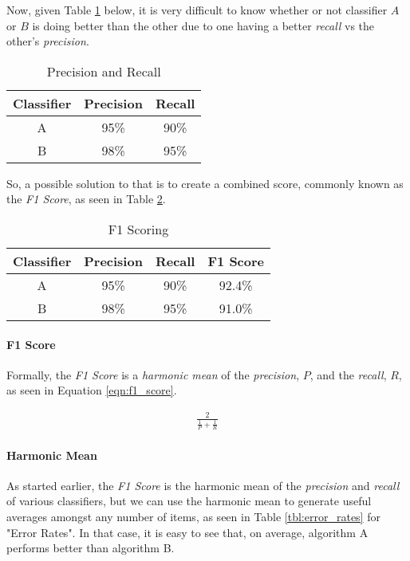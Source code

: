 \documentclass{article}
\begin{document}
Now, given Table \ref{tbl:precision_and_recall} below, it is very difficult to know whether or not classifier $A$ or $B$ is doing better than the other due to one having a better \textit{recall} vs the other's \textit{precision}.

\begin{table}[ht]
\begin{center}
\begin{tabular}[h]{c | c | c}
Classifier & Precision & Recall \\ \hline
A & 95\% & 90\% \\
B & 98\% & 95\%
\end{tabular}
\caption{Precision and Recall} \label{tbl:precision_and_recall}
\end{center}
\end{table}

So, a possible solution to that is to create a combined score, commonly known as the \textit{F1 Score}, as seen in Table \ref{tbl:f1_score}.

\begin{table}[ht]
\begin{center}
\begin{tabular}[h]{c | c | c | c}
Classifier & Precision & Recall & F1 Score \\ \hline
A & 95\% & 90\% & 92.4\% \\
B & 98\% & 95\% & 91.0\%
\end{tabular}
\caption{F1 Scoring} \label{tbl:f1_score}
\end{center}
\end{table}

\paragraph{F1 Score}

Formally, the \textit{F1 Score} is a \textit{harmonic mean} of the \textit{precision}, $P$, and the \textit{recall}, $R$, as seen in Equation \ref{eqn:f1_score}.

\begin{gather}
\frac{2}{\frac{1}{P} + \frac{1}{R}} \label{eqn:f1_score}
\end{gather}

\paragraph{Harmonic Mean}

As started earlier, the \textit{F1 Score} is the harmonic mean of the \textit{precision} and \textit{recall} of various classifiers, but we can use the harmonic mean to generate useful averages amongst any number of items, as seen in Table \ref{tbl:error_rates} for "Error Rates".  In that case, it is easy to see that, on average, algorithm A performs better than algorithm B.
\end{document}
